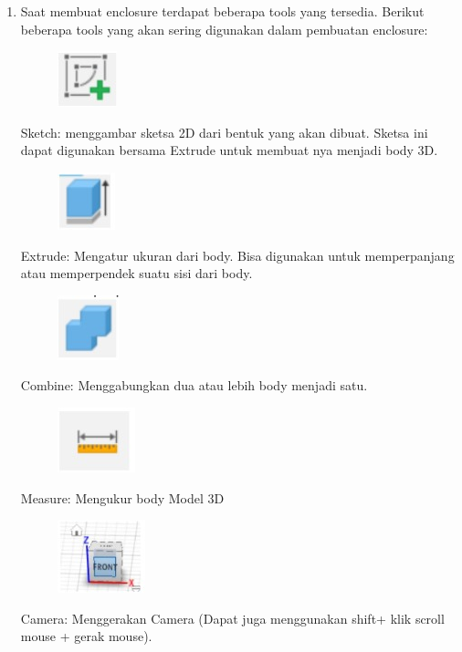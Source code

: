 \begin{enumerate}
        \item Saat membuat enclosure terdapat beberapa tools yang tersedia. Berikut beberapa tools yang
        akan sering digunakan dalam pembuatan enclosure:
            \begin{figure}[H]
                \centering
                \includegraphics[width=0.1\linewidth]{P3/img/image6.jpg}
            \end{figure}
        \begin{flushleft}
    Sketch: menggambar sketsa 2D dari bentuk yang akan dibuat. Sketsa ini dapat digunakan
    bersama Extrude untuk membuat nya menjadi body 3D.
        \begin{figure}[H]
            \centering
            \includegraphics[width=0.1\linewidth]{P3/img/image7.jpg}
        \end{figure}
    Extrude: Mengatur ukuran dari body. Bisa digunakan untuk memperpanjang atau
    memperpendek suatu sisi dari body.
        \begin{figure}[H]
            \centering
            \includegraphics[width=0.1\linewidth]{P3/img/image8.jpg}
        \end{figure}
    Combine: Menggabungkan dua atau lebih body menjadi satu.
        \begin{figure}[H]
            \centering
            \includegraphics[width=0.1\linewidth]{P3/img/image9.jpg}
        \end{figure}
    Measure: Mengukur body Model 3D
        \begin{figure}[H]
            \centering
            \includegraphics[width=0.1\linewidth]{P3/img/image10.jpg}
        \end{figure}
    Camera: Menggerakan Camera (Dapat juga menggunakan shift+ klik scroll mouse + gerak
    mouse).
    \end{flushleft}
\end{enumerate}

